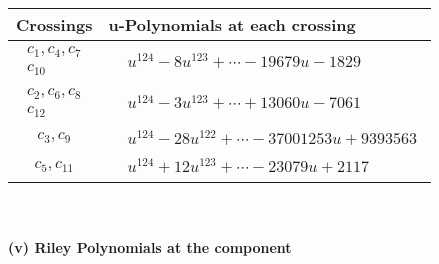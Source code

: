 \documentclass[1p]{elsarticle_modified}
\theoremstyle{definition}
\begin{document}
\begin{tabular}{m{50pt}|m{274pt}}
Crossings & \hspace{64pt}u-Polynomials at each crossing \\
\hline $$\begin{aligned}c_{1},c_{4},c_{7}\\c_{10}\end{aligned}$$&$\begin{aligned}
&u^{124}-8 u^{123}+\cdots-19679 u-1829
\end{aligned}$\\
\hline $$\begin{aligned}c_{2},c_{6},c_{8}\\c_{12}\end{aligned}$$&$\begin{aligned}
&u^{124}-3 u^{123}+\cdots+13060 u-7061
\end{aligned}$\\
\hline $$\begin{aligned}c_{3},c_{9}\end{aligned}$$&$\begin{aligned}
&u^{124}-28 u^{122}+\cdots-37001253 u+9393563
\end{aligned}$\\
\hline $$\begin{aligned}c_{5},c_{11}\end{aligned}$$&$\begin{aligned}
&u^{124}+12 u^{123}+\cdots-23079 u+2117
\end{aligned}$\\
\hline
\end{tabular}\\~\\
\newpage\renewcommand{\arraystretch}{1}
\flushleft \textbf{(v) Riley Polynomials at the component}\newline \\
\end{document}
